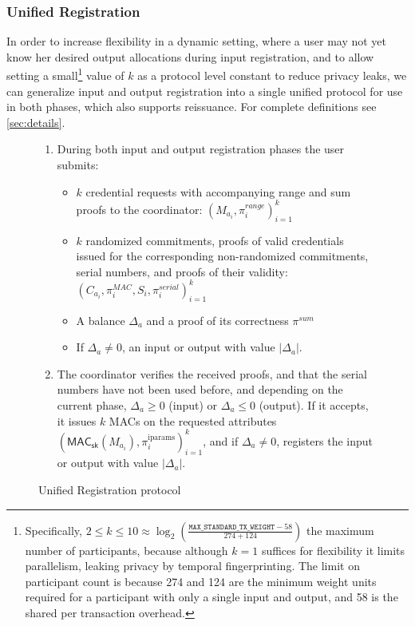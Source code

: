 \documentclass[a4paper]{article}
\begin{document}
\subsubsection{Unified Registration}\label{sec:unified}

In order to increase flexibility in a dynamic setting, where a user may not yet know her desired output allocations during input registration, and to allow setting a small\footnote{Specifically, $2 \le k \le 10 \approx \log_2\left(\frac{\mathtt{MAX\_STANDARD\_TX\_WEIGHT} - 58}{274 + 124}\right)$ the maximum number of participants, because although $k=1$ suffices for flexibility it limits parallelism, leaking privacy by temporal fingerprinting. The limit on participant count is because 274 and 124 are the minimum weight units required for a participant with only a single input and output, and 58 is the shared per transaction overhead.} value of $k$ as a protocol level constant to reduce privacy leaks, we can generalize input and output registration into a single unified protocol for use in both phases, which also supports reissuance. For complete definitions see \cref{sec:details}.

\begin{figure}[h!]
    \begin{mdframed}
    \begin{enumerate}
        \item During both input and output registration phases the user submits:
        \begin{itemize}
            \item $k$ credential requests with accompanying range and sum proofs to the coordinator:  $(M_{a_i},\pi^{\textit{range}}_{i})^{k}_{i=1}$
            \item $k$ randomized commitments, proofs of valid credentials issued for the corresponding non-randomized commitments, serial numbers, and proofs of their validity: $(C_{a_i},\pi_{i}^{\mathit{MAC}},S_i,\pi_i^{\textit{serial}})^{k}_{i=1}$
            \item A balance $\Delta_{a}$ and a proof of its correctness $\pi^{\textit{sum}}$
            \item If $\Delta_{a} \ne 0$, an input or output with value $|\Delta_{a}|$.
        \end{itemize}
        \item The coordinator verifies the received proofs, and that the serial numbers have not been used before, and depending on the current phase, $\Delta_{a} \geq 0$ (input) or $\Delta_{a} \leq 0$ (output). If it accepts, it issues $k$ MACs on the requested attributes $(\mathsf{MAC}_\mathsf{sk}(M_{a_i}), \pi_i^{\mathrm{iparams}})^{k}_{i=1}$, and if $\Delta_{a} \ne 0$, registers the input or output with value $|\Delta_{a}|$.
    \end{enumerate}
    \end{mdframed}
    \caption{Unified Registration protocol}
    \label{fig:reissue}
\end{figure}
\end{document}
